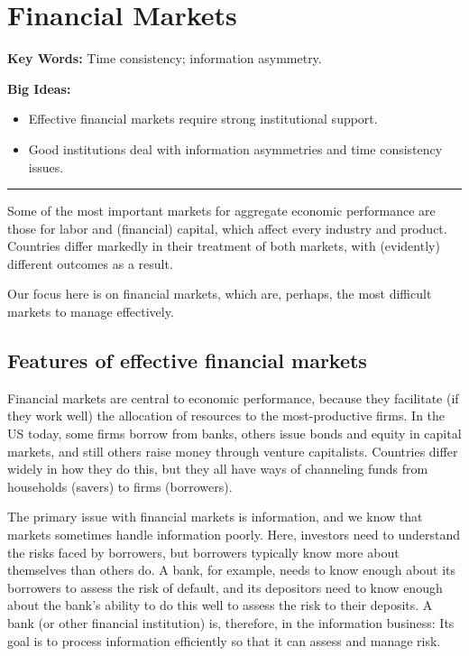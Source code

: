 \chapter{Financial Markets}\label{chp:fnmk}
\hypertarget{finance}{}

\textbf{Key Words:} Time consistency; information asymmetry.

\textbf{Big Ideas:}
\vspace{-0.1in}
\begin{itemize}
\item Effective financial markets require strong institutional support.  
\item Good institutions deal with information asymmetries and time consistency issues.
\end{itemize}
\rule{\textwidth}{1pt}

Some of the most important markets for aggregate economic performance
are those for labor and (financial) capital,
which affect every industry and product.
Countries differ markedly in their treatment of both markets,
with (evidently) different outcomes as a result.

Our focus here is on financial markets,
which are, perhaps, the most difficult markets to manage effectively.


\section{Features of effective financial markets}

Financial markets are central to economic performance,
because they facilitate (if they work well)
the allocation of resources to the most-productive firms.
In the US today,
some firms borrow from banks,
others issue bonds and equity in capital markets,
and still others raise money through venture capitalists.
Countries differ widely in how they do this,
but they all have ways of channeling funds from
households (savers) to firms (borrowers).


The primary issue with financial markets is information,
and we know that markets sometimes handle information poorly.
Here, investors need to understand the risks faced by borrowers,
but borrowers typically know more about themselves than others do.
A bank, for example, needs to know enough about its borrowers to
assess the risk of default,
and its depositors need to know enough about the bank's ability to
do this well to assess the risk to their deposits.
A bank (or other financial institution) is, therefore, in the information business:
Its goal is to process information efficiently so that it
can assess and manage risk.

